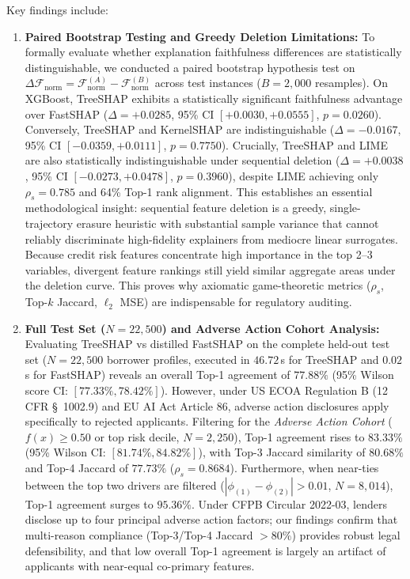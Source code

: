 \documentclass[conference]{IEEEtran}
\begin{document}
Key findings include:
\begin{enumerate}
    \item \textbf{Paired Bootstrap Testing and Greedy Deletion Limitations:} To formally evaluate whether explanation faithfulness differences are statistically distinguishable, we conducted a paired bootstrap hypothesis test on $\Delta \mathcal{F}_{\text{norm}} = \mathcal{F}_{\text{norm}}^{(A)} - \mathcal{F}_{\text{norm}}^{(B)}$ across test instances ($B=2,000$ resamples). On XGBoost, TreeSHAP exhibits a statistically significant faithfulness advantage over FastSHAP ($\Delta = +0.0285$, 95\% CI $[+0.0030, +0.0555]$, $p = 0.0260$). Conversely, TreeSHAP and KernelSHAP are indistinguishable ($\Delta = -0.0167$, 95\% CI $[-0.0359, +0.0111]$, $p = 0.7750$). Crucially, TreeSHAP and LIME are also statistically indistinguishable under sequential deletion ($\Delta = +0.0038$, 95\% CI $[-0.0273, +0.0478]$, $p = 0.3960$), despite LIME achieving only $\rho_s = 0.785$ and 64\% Top-1 rank alignment. This establishes an essential methodological insight: sequential feature deletion is a greedy, single-trajectory erasure heuristic with substantial sample variance that cannot reliably discriminate high-fidelity explainers from mediocre linear surrogates. Because credit risk features concentrate high importance in the top 2--3 variables, divergent feature rankings still yield similar aggregate areas under the deletion curve. This proves why axiomatic game-theoretic metrics ($\rho_s$, Top-$k$ Jaccard, $\ell_2$ MSE) are indispensable for regulatory auditing.
    \item \textbf{Full Test Set ($N=22,500$) and Adverse Action Cohort Analysis:} Evaluating TreeSHAP vs distilled FastSHAP on the complete held-out test set ($N=22,500$ borrower profiles, executed in $46.72$\,s for TreeSHAP and $0.02$\,s for FastSHAP) reveals an overall Top-1 agreement of $77.88\%$ (95\% Wilson score CI: $[77.33\%, 78.42\%]$). However, under US ECOA Regulation B (12 CFR \S~1002.9) and EU AI Act Article 86, adverse action disclosures apply specifically to rejected applicants. Filtering for the \textit{Adverse Action Cohort} ($f(x) \ge 0.50$ or top risk decile, $N=2,250$), Top-1 agreement rises to $\mathbf{83.33\%}$ (95\% Wilson CI: $[81.74\%, 84.82\%]$), with Top-3 Jaccard similarity of $\mathbf{80.68\%}$ and Top-4 Jaccard of $\mathbf{77.73\%}$ ($\rho_s = 0.8684$). Furthermore, when near-ties between the top two drivers are filtered ($|\phi_{(1)} - \phi_{(2)}| > 0.01$, $N=8,014$), Top-1 agreement surges to $\mathbf{95.36\%}$. Under CFPB Circular 2022-03, lenders disclose up to four principal adverse action factors; our findings confirm that multi-reason compliance (Top-3/Top-4 Jaccard $>80\%$) provides robust legal defensibility, and that low overall Top-1 agreement is largely an artifact of applicants with near-equal co-primary features.

\end{enumerate}
\end{document}
